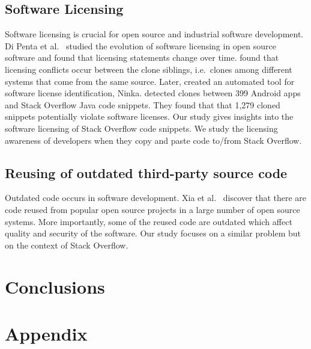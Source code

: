 \documentclass{svjour3}                     %
\begin{document}
\subsection{Software Licensing}
Software licensing is crucial for open source and industrial software
development. Di Penta et al.~\cite{DiPenta2010} studied the evolution of
software licensing in open source software and found that licensing statements
change over time. \cite{German2009} found that licensing conflicts occur between
the clone siblings, i.e.~clones among different systems that come from the same
source. Later, \cite{German2010} created an automated tool for software license
identification, Ninka. \cite{An2017} detected clones between 399 Android apps
and Stack Overflow Java code snippets. They found that  that 1,279 cloned
snippets potentially violate software licenses. Our study gives insights into
the software licensing of Stack Overflow code snippets. We study the licensing
awareness of developers when they copy and paste code to/from Stack Overflow.

\subsection{Reusing of outdated third-party source code} 
Outdated code occurs in software development. Xia et al.~\cite{Xia2014} discover
that there are code reused from popular open source projects in a large number
of open source systems. More importantly, some of the reused code are outdated
which affect quality and security of the software. Our study focuses on a
similar problem but on the context of Stack Overflow.

\section{Conclusions}

%
%

 

\clearpage
\section{Appendix}
\appendix
\end{document}
